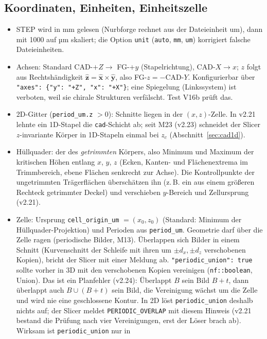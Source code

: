\subsection{Koordinaten, Einheiten, Einheitszelle}
\begin{itemize}[nosep]
  \item STEP wird in mm gelesen (Nurbforge rechnet aus der Dateieinheit um), dann mit 1000 auf µm skaliert;
        die Option \verb|unit| (\verb|auto|, \verb|mm|, \verb|um|) korrigiert falsche Dateieinheiten.
  \item Achsen: Standard CAD-$+Z\to$ FG-$+y$ (Stapelrichtung), CAD-$X\to x$; $z$ folgt aus Rechtshändigkeit
        $\hat{\mathbf z}=\hat{\mathbf x}\times\hat{\mathbf y}$, also FG-$z=-$CAD-$Y$. Konfigurierbar über
        \verb|"axes": {"y": "+Z", "x": "+X"}|; eine Spiegelung (Linkssystem) ist verboten, weil sie chirale Strukturen
        verfälscht. Test V16b prüft das.
  \item 2D-Gitter (\verb|period_um.z| $>0$): Schnitte liegen in der $(x,z)$-Zelle. In v2.21 lehnte ein 1D-Stapel die
        \verb|cad|-Schicht ab; seit M23 (v2.23) schneidet der Slicer $z$-invariante Körper in 1D-Stapeln einmal bei
        $z_c$ (Abschnitt~\ref{sec:cad1d}).
  \item Hüllquader: der des \emph{getrimmten} Körpers, also Minimum und Maximum der kritischen Höhen entlang $x$, $y$, $z$
        (Ecken, Kanten- und Flächenextrema im Trimmbereich, ebene Flächen senkrecht zur Achse). Die Kontrollpunkte der
        ungetrimmten Trägerflächen überschätzen ihn (z.\,B. ein aus einem größeren Rechteck getrimmter Deckel) und
        verschieben $y$-Bereich und Zellursprung (v2.21).
  \item Zelle: Ursprung \verb|cell_origin_um| $=(x_0,z_0)$ (Standard: Minimum der Hüllquader-Projektion) und Perioden aus
        \verb|period_um|. Geometrie darf über die Zelle ragen (periodische Bilder, M13). Überlappen sich Bilder in
        einem Schnitt (Kurvenschnitt der Schleife mit ihren um $\pm d_x,\pm d_z$ verschobenen Kopien), bricht der Slicer
        mit einer Meldung ab. \verb|"periodic_union": true| sollte vorher in 3D mit den verschobenen Kopien vereinigen
        (\verb|nf::boolean|, Union). Das ist ein Planfehler (v2.24): Überlappt $B$ sein Bild $B+t$, dann überlappt auch
        $B\cup(B+t)$ sein Bild, die Vereinigung wächst um die Zelle und wird nie eine geschlossene Kontur. In 2D löst
        \verb|periodic_union| deshalb nichts auf; der Slicer meldet \verb|PERIODIC_OVERLAP| mit diesem Hinweis (v2.21
        bestand die Prüfung nach vier Vereinigungen, erst der Löser brach ab). Wirksam ist \verb|periodic_union| nur in

\end{itemize}
